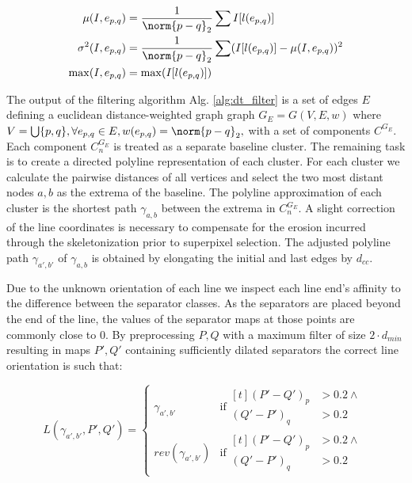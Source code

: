 \begin{eqnarray*}
	\mu(I, e_{p, q}) &= \frac{1}{\norm{p - q}_2}\sum I[l(e_{p, q})]\\
	\sigma^2(I, e_{p, q}) &= \frac{1}{\norm{p - q}_2}\sum (I[l(e_{p, q})] - \mu(I, e_{p, q}))^2\\
	\max(I, e_{p, q}) &= \max(I[l(e_{p, q})])
\end{eqnarray*}

The output of the filtering algorithm Alg. \ref{alg:dt_filter} is a set of
edges $E$ defining a euclidean distance-weighted graph graph $G_E = G(V, E, w)$
where $V=\bigcup \{p, q\}, \forall e_{p,q} \in E, w(e_{p, q})= \norm{p - q}_2,
$ with a set of components $C^{G_E}$. Each component $C^{G_E}_n$ is treated as
a separate baseline cluster. The remaining task is to create a directed
polyline representation of each cluster. For each cluster we calculate the
pairwise distances of all vertices and select the two most distant nodes $a, b$
as the extrema of the baseline. The polyline approximation of each cluster is
the shortest path $\gamma_{a, b}$ between the extrema in $C^{G_E}_n$. A slight
correction of the line coordinates is necessary to compensate for the erosion
incurred through the skeletonization prior to superpixel selection. The
adjusted polyline path $\gamma_{a', b'}$ of $\gamma_{a, b}$ is obtained by
elongating the initial and last edges by $d_{cc}$.

Due to the unknown orientation of each line we inspect each line end's affinity
to the difference between the separator classes. As the separators are placed
beyond the end of the line, the values of the separator maps at those points
are commonly close to $0$. By preprocessing $P, Q$ with a maximum filter of
size $2 \cdot d_{min}$ resulting in maps $P', Q'$ containing sufficiently
dilated separators the correct line orientation is such that:

\begin{equation*}
	L(\gamma_{a', b'}, P', Q') = 
	\begin{cases}
		\gamma_{a', b'} &\text{if}
				\!\begin{aligned}[t]
					(P'-Q')_p &> 0.2 \land \\
					(Q'-P')_q &> 0.2
				\end{aligned}\\
		rev(\gamma_{a', b'}) & \text{if}
				\!\begin{aligned}[t]
					(P'-Q')_p &> 0.2 \land \\
					(Q'-P')_q &> 0.2
				\end{aligned}
	\end{cases}
\end{equation*}

